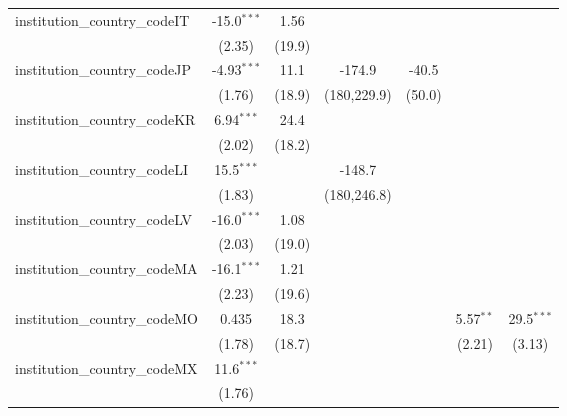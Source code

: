 \begin{tabular}{lcccccc}
   institution\_country\_codeIT          & -15.0$^{***}$ & 1.56         &               &               &               &   \\   
                                         & (2.35)        & (19.9)       &               &               &               &   \\   
   institution\_country\_codeJP          & -4.93$^{***}$ & 11.1         & -174.9        & -40.5         &               &   \\   
                                         & (1.76)        & (18.9)       & (180,229.9)   & (50.0)        &               &   \\   
   institution\_country\_codeKR          & 6.94$^{***}$  & 24.4         &               &               &               &   \\   
                                         & (2.02)        & (18.2)       &               &               &               &   \\   
   institution\_country\_codeLI          & 15.5$^{***}$  &              & -148.7        &               &               &   \\   
                                         & (1.83)        &              & (180,246.8)   &               &               &   \\   
   institution\_country\_codeLV          & -16.0$^{***}$ & 1.08         &               &               &               &   \\   
                                         & (2.03)        & (19.0)       &               &               &               &   \\   
   institution\_country\_codeMA          & -16.1$^{***}$ & 1.21         &               &               &               &   \\   
                                         & (2.23)        & (19.6)       &               &               &               &   \\   
   institution\_country\_codeMO          & 0.435         & 18.3         &               &               & 5.57$^{**}$   & 29.5$^{***}$\\   
                                         & (1.78)        & (18.7)       &               &               & (2.21)        & (3.13)\\   
   institution\_country\_codeMX          & 11.6$^{***}$  &              &               &               &               &   \\   
                                         & (1.76)        &              &               &               &               &   \\   

\end{tabular}
